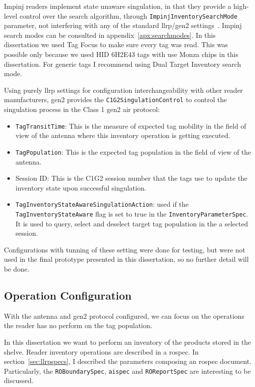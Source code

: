 Impinj readers implement state unaware singulation, in that they provide a high-level control over the search algorithm, through \texttt{ImpinjInventorySearchMode} parameter, not interfering with any of the standard \ac{llrp}/\ac{gen2} settings~\cite{ImpinjOctaneLLRP, UnderstandingEPCGen2}.
Impinj search modes can be consulted in appendix~\ref{apx:searchmodes}.
In this dissertation we used Tag Focus to make sure every tag was read. This was possible only because we used HID 6H2E43 tags with use Monza chips in this dissertation. For generic tags I recommend using Dual Target Inventory search mode.

Using purely \ac{llrp} settings for configuration interchangeability with other reader manufacturers, \ac{gen2} provides the \texttt{C1G2SingulationControl} to control the singulation process in the Class 1 \ac{gen2} air protocol:

\begin{itemize}
    \item \texttt{TagTransitTime}: This is the measure of expected tag mobility in the field of view of the antenna where this inventory operation is getting executed.
    \item \texttt{TagPopulation}: This is the expected tag population in the field of view of the antenna.
    \item Session ID: This is the C1G2 session number that the tags use to update the inventory state upon successful singulation.
    \item \texttt{TagInventoryStateAwareSingulationAction}: used if the \texttt{TagInventoryStateAware} flag is set to true in the \texttt{InventoryParameterSpec}. It is used to query, select and deselect target tag population in the a selected session.
\end{itemize}

Configurations with tunning of these setting were done for testing, but were not used in the final prototype presented in this dissertation, so no further detail will be done.

\subsection{Operation Configuration}

With the antenna and \ac{gen2} protocol configured, we can focus on the operations the reader has no perform on the tag population.

In this dissertation we want to perform an inventory of the products stored in the shelve. Reader inventory operations are described in a \ac{rospec}.
In section~\ref{sec:llrpspecs}, I described the parameters composing an \ac{rospec} document. Particularly, the \texttt{ROBoundarySpec}, \texttt{\acs{aispec}} and \texttt{ROReportSpec} are interesting to be discussed.

